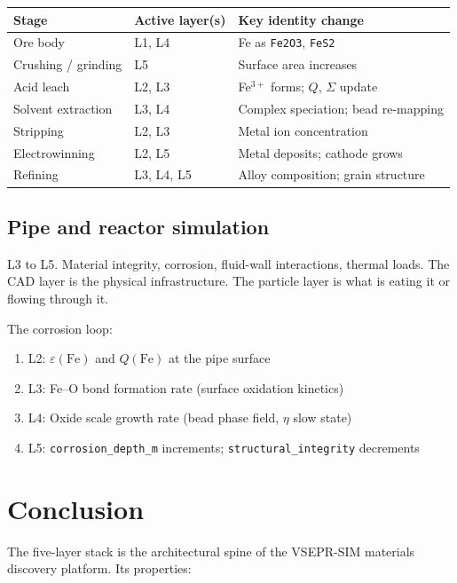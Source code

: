 \documentclass[11pt, a4paper, oneside]{article}
\theoremstyle{definition}
\begin{document}
\begin{center}
\begin{tabular}{lll}
\toprule
Stage & Active layer(s) & Key identity change \\
\midrule
Ore body & L1, L4 & Fe as \texttt{Fe2O3}, \texttt{FeS2} \\
Crushing / grinding & L5 & Surface area increases \\
Acid leach & L2, L3 & Fe$^{3+}$ forms; $Q$, $\Sigma$ update \\
Solvent extraction & L3, L4 & Complex speciation; bead re-mapping \\
Stripping & L2, L3 & Metal ion concentration \\
Electrowinning & L2, L5 & Metal deposits; cathode grows \\
Refining & L3, L4, L5 & Alloy composition; grain structure \\
\bottomrule
\end{tabular}
\end{center}

\subsection{Pipe and reactor simulation}

L3 to L5.  Material integrity, corrosion, fluid-wall interactions,
thermal loads.  The CAD layer is the physical infrastructure.
The particle layer is what is eating it or flowing through it.

The corrosion loop:
\begin{enumerate}
  \item L2: $\varepsilon(\mathrm{Fe})$ and $Q(\mathrm{Fe})$ at the pipe surface
  \item L3: Fe–O bond formation rate (surface oxidation kinetics)
  \item L4: Oxide scale growth rate (bead phase field, $\eta$ slow state)
  \item L5: \texttt{corrosion\_depth\_m} increments; \texttt{structural\_integrity} decrements
\end{enumerate}

\section*{Conclusion}

The five-layer stack is the architectural spine of the VSEPR-SIM
materials discovery platform.  Its properties:
\end{document}
